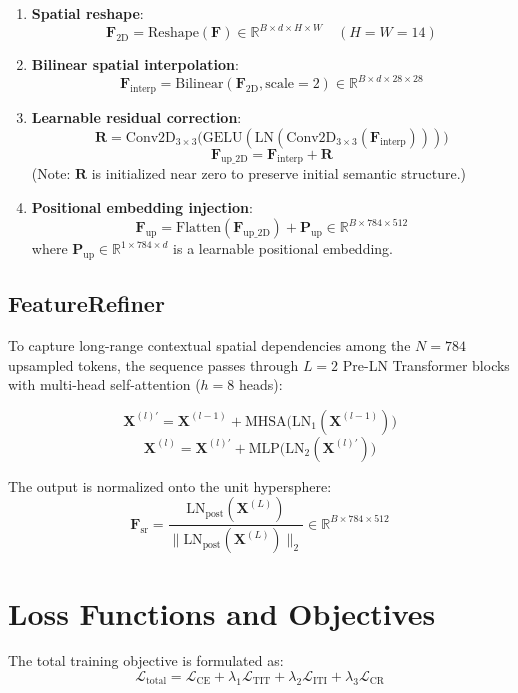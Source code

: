 \documentclass[conference]{IEEEtran}
\begin{document}
\begin{enumerate}
\item \textbf{Spatial reshape}:
\[ \mathbf{F}_{\text{2D}} = \text{Reshape}(\mathbf{F}) \in \mathbb{R}^{B \times d \times H \times W} \quad (H=W=14) \]
\item \textbf{Bilinear spatial interpolation}:
\[ \mathbf{F}_{\text{interp}} = \text{Bilinear}(\mathbf{F}_{\text{2D}}, \text{scale}=2) \in \mathbb{R}^{B \times d \times 28 \times 28} \]
\item \textbf{Learnable residual correction}:
\[ \mathbf{R} = \text{Conv2D}_{3\times3}\big(\text{GELU}(\text{LN}(\text{Conv2D}_{3\times3}(\mathbf{F}_{\text{interp}})))\big) \]
\[ \mathbf{F}_{\text{up\_2D}} = \mathbf{F}_{\text{interp}} + \mathbf{R} \]
(Note: $\mathbf{R}$ is initialized near zero to preserve initial semantic structure.)
\item \textbf{Positional embedding injection}:
\[ \mathbf{F}_{\text{up}} = \text{Flatten}(\mathbf{F}_{\text{up\_2D}}) + \mathbf{P}_{\text{up}} \in \mathbb{R}^{B \times 784 \times 512} \]
where $\mathbf{P}_{\text{up}} \in \mathbb{R}^{1 \times 784 \times d}$ is a learnable positional embedding.
\end{enumerate}

\subsection{FeatureRefiner}
To capture long-range contextual spatial dependencies among the $N=784$ upsampled tokens, the sequence passes through $L=2$ Pre-LN Transformer blocks with multi-head self-attention ($h=8$ heads):

\[ \mathbf{X}^{(l)\prime} = \mathbf{X}^{(l-1)} + \text{MHSA}\big(\text{LN}_1(\mathbf{X}^{(l-1)})\big) \]
\[ \mathbf{X}^{(l)} = \mathbf{X}^{(l)\prime} + \text{MLP}\big(\text{LN}_2(\mathbf{X}^{(l)\prime})\big) \]

The output is normalized onto the unit hypersphere:
\[ \mathbf{F}_{\text{sr}} = \frac{\text{LN}_{\text{post}}(\mathbf{X}^{(L)})}{\|\text{LN}_{\text{post}}(\mathbf{X}^{(L)})\|_2} \in \mathbb{R}^{B \times 784 \times 512} \]

\section{Loss Functions and Objectives}

The total training objective is formulated as:
\[ \mathcal{L}_{\text{total}} = \mathcal{L}_{\text{CE}} + \lambda_1 \mathcal{L}_{\text{TIT}} + \lambda_2 \mathcal{L}_{\text{ITI}} + \lambda_3 \mathcal{L}_{\text{CR}} \]
\end{document}
